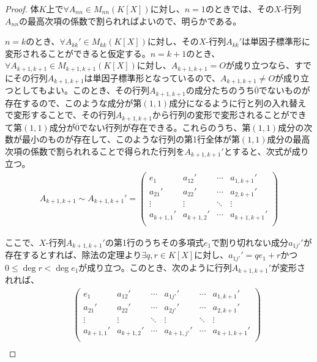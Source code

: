 \documentclass[dvipdfmx]{jsarticle}
\begin{document}
\begin{proof}
体$K$上で$\forall A_{nn} \in M_{nn}\left( K[ X] \right)$に対し、$n = 1$のときでは、その$X$-行列$A_{nn}$の最高次項の係数で割られればよいので、明らかである。\par
$n = k$のとき、$\forall A_{kk}' \in M_{kk}\left( K[ X] \right)$に対し、その$X$-行列$A_{kk}'$は単因子標準形に変形されることができると仮定する。$n = k + 1$のとき、$\forall A_{k + 1,k + 1} \in M_{k + 1,k + 1}\left( K[ X] \right)$に対し、$A_{k + 1,k + 1} = O$が成り立つなら、すでにその行列$A_{k + 1,k + 1}$は単因子標準形となっているので、$A_{k + 1,k + 1} \neq O$が成り立つとしてもよい。このとき、その行列$A_{k + 1,k + 1}$の成分たちのうち$\overline{0}$でないものが存在するので、このような成分が第$(1,1)$成分になるように行と列の入れ替えで変形することで、その行列$A_{k + 1,k + 1}$から行列の変形で変形されることができて第$(1,1)$成分が$\overline{0}$でない行列が存在できる。これらのうち、第$(1,1)$成分の次数が最小のものが存在して、このような行列の第1行全体が第$(1,1)$成分の最高次項の係数で割られれることで得られた行列を$A_{k + 1,k + 1}'$とすると、次式が成り立つ。
\begin{align*}
A_{k + 1,k + 1} \sim A_{k + 1,k + 1}' = \begin{pmatrix}
e_{1} & a_{12}' & \cdots & a_{1,k + 1}' \\
a_{21}' & a_{22}' & \cdots & a_{2,k + 1}' \\
 \vdots & \vdots & \ddots & \vdots \\
a_{k + 1,1}' & a_{k + 1,2}' & \cdots & a_{k + 1,k + 1}' \\
\end{pmatrix}
\end{align*}\par
ここで、$X$-行列$A_{k + 1,k + 1}'$の第1行のうちその多項式$e_{1}$で割り切れない成分$a_{1j'}'$が存在するとすれば、除法の定理より$\exists q,r \in K[ X]$に対し、$a_{1j'}' = qe_{1} + r$かつ$0 \leq \deg r < \deg e_{1}$が成り立つ。このとき、次のように行列$A_{k + 1,k + 1}'$が変形されれば、
\begin{align*}
&\quad \begin{pmatrix}
e_{1} & a_{12}' & \cdots & a_{1j'}' & \cdots & a_{1,k + 1}' \\
a_{21}' & a_{22}' & \cdots & a_{2j'}' & \cdots & a_{2,k + 1}' \\
 \vdots & \vdots & \ddots & \vdots & \ddots & \vdots \\
a_{k + 1,1}' & a_{k + 1,2}' & \cdots & a_{k + 1,j'}' & \cdots & a_{k + 1,k + 1}' \\
\end{pmatrix}\\

\end{align*}
\end{proof}
\end{document}
